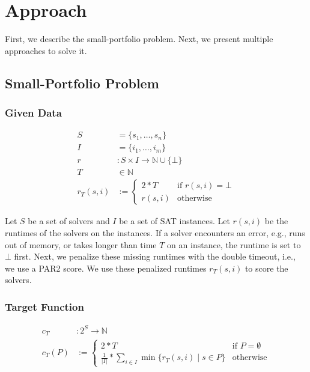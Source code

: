 \documentclass[conference]{IEEEtran}
\begin{document}
\section{Approach}
\label{sec:approach}

First, we describe the small-portfolio problem.
Next, we present multiple approaches to solve it.

\subsection{Small-Portfolio Problem}

\subsubsection{Given Data}
\label{sec:approach:problem:data}

\begin{align*}
	S &= \{s_1, \dots, s_n\} \tag*{Solvers}\\
	I &= \{i_1, \dots, i_m\} \tag*{Instances}\\
	r &: S \times I \rightarrow \mathbb{N} \cup \{\bot\} \tag*{Runtimes (censored)}\\
	T &\in \mathbb{N} \tag*{Timeout}\\
	r_T(s,i) &:= \begin{cases}
		2*T & \text{if }r(s,i) = \bot\\
		r(s,i) & \text{otherwise}
	\end{cases} \tag*{Penalized Runtimes}
\end{align*}

Let $S$ be a set of solvers and $I$ be a set of SAT instances.
Let $r(s,i)$ be the runtimes of the solvers on the instances.
If a solver encounters an error, e.g., runs out of memory, or takes longer than time $T$ on an instance, the runtime is set to $\bot$ first.
Next, we penalize these missing runtimes with the double timeout, i.e., we use a PAR2 score.
We use these penalized runtimes $r_T(s,i)$ to score the solvers.

\subsubsection{Target Function}
\label{sec:approach:problem:target}

\begin{align*}
	c_{T} &: 2^S \rightarrow \mathbb{N}\\
	c_{T}(P) &:= \begin{cases}
		2*T & \text{if }P=\emptyset\\
		\frac{1}{|I|} * \sum_{i \in I}{\min\{r_T(s,i) \mid s \in P\}} & \text{otherwise}
	\end{cases} \tag*{Portfolio Cost}
\end{align*}
\end{document}
